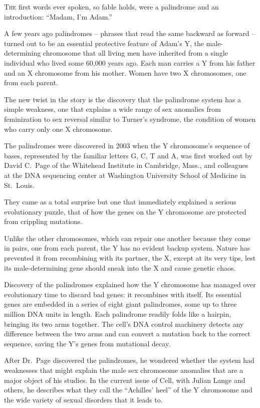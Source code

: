 ﻿\documentclass[12pt]{article}
\begin{document}
\lettrine{T}{he} first words ever spoken, so fable\cite{fable} holds, were a
palindrome\cite{palindrome} and an introduction: ``Madam, I'm Adam.''

A few years ago palindromes -- phrases that read the same backward as forward -- turned out to be an
essential protective feature of Adam's Y, the male-determining chromosome that all living men have
inherited from a single individual who lived some 60,000 years ago. Each man carries a Y from his
father and an X chromosome from his mother. Women have two X chromosomes, one from each parent.

The new twist in the story is the discovery that the palindrome system has a simple weakness, one
that explains a wide range of sex anomalies from feminization to sex reversal similar to Turner's
syndrome, the condition of women who carry only one X chromosome.

The palindromes were discovered in 2003 when the Y chromosome's sequence of bases, represented by
the familiar letters G, C, T and A, was first worked out by David C.~Page of the Whitehead Institute
in Cambridge, Mass., and colleagues at the DNA sequencing center at Washington University School of
Medicine in St.~Louis.

They came as a total surprise but one that immediately explained a serious evolutionary puzzle, that
of how the genes on the Y chromosome are protected from crippling mutations.

Unlike the other chromosomes, which can repair one another because they come in pairs, one from each
parent, the Y has no evident backup system. Nature has prevented it from recombining with its
partner, the X, except at its very tips, lest its male-determining gene should sneak into the X and
cause genetic chaos.

Discovery of the palindromes explained how the Y chromosome has managed over evolutionary time to
discard bad genes: it recombines with itself. Its essential genes are embedded in a series of eight
giant palindromes, some up to three million DNA units in length. Each palindrome readily folds like
a hairpin, bringing its two arms together. The cell's DNA control machinery detects any difference
between the two arms and can convert a mutation back to the correct sequence, saving the Y's genes
from mutational decay.

After Dr.~Page discovered the palindromes, he wondered whether the system had weaknesses that might
explain the male sex chromosome anomalies that are a major object of his studies. In the current
issue of Cell, with Julian Lange and others, he describes what they call the ``Achilles' heel'' of
the Y chromosome and the wide variety of sexual disorders that it leads to.
\end{document}
